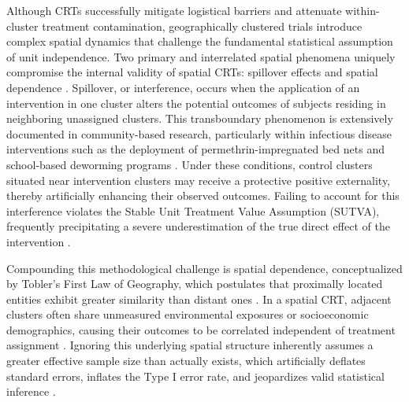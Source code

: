 \documentclass[11pt]{article}
\begin{document}
Although CRTs successfully mitigate logistical barriers and attenuate within-cluster treatment contamination, geographically clustered trials introduce complex spatial dynamics that challenge the fundamental statistical assumption of unit independence. Two primary and interrelated spatial phenomena uniquely compromise the internal validity of spatial CRTs: spillover effects and spatial dependence \cite{hayes_cluster_2017, hudgens_toward_2008}. Spillover, or interference, occurs when the application of an intervention in one cluster alters the potential outcomes of subjects residing in neighboring unassigned clusters. This transboundary phenomenon is extensively documented in community-based research, particularly within infectious disease interventions such as the deployment of permethrin-impregnated bed nets \cite{binka_impact_1998, gimnig_effect_2003, hawley_community-wide_2003} and school-based deworming programs \cite{miguel_worms_2004}. Under these conditions, control clusters situated near intervention clusters may receive a protective positive externality, thereby artificially enhancing their observed outcomes. Failing to account for this interference violates the Stable Unit Treatment Value Assumption (SUTVA), frequently precipitating a severe underestimation of the true direct effect of the intervention \cite{anayaizquierdo_spatial_2021}.

Compounding this methodological challenge is spatial dependence, conceptualized by Tobler’s First Law of Geography, which postulates that proximally located entities exhibit greater similarity than distant ones \cite{tobler_computer_1970}. In a spatial CRT, adjacent clusters often share unmeasured environmental exposures or socioeconomic demographics, causing their outcomes to be correlated independent of treatment assignment \cite{cressie_statistics_1993}. Ignoring this underlying spatial structure inherently assumes a greater effective sample size than actually exists, which artificially deflates standard errors, inflates the Type I error rate, and jeopardizes valid statistical inference \cite{campbell_how_2014, ntani_consequences_2021}.
\end{document}
